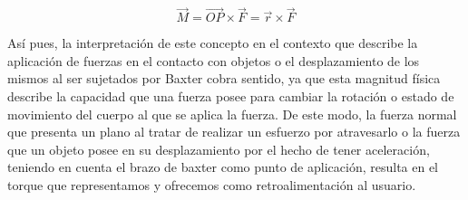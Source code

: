 $$\overrightarrow M = \overrightarrow {OP} \times \overrightarrow F = \overrightarrow r \times \overrightarrow F$$

Así pues, la interpretación de este concepto en el contexto que describe la aplicación de fuerzas en el contacto con objetos o el desplazamiento de los mismos al ser sujetados por Baxter cobra sentido, ya que esta magnitud física describe la capacidad que una fuerza posee para cambiar la rotación o estado de movimiento del cuerpo al que se aplica la fuerza. De este modo, la fuerza normal que presenta un plano al tratar de realizar un esfuerzo por atravesarlo o la fuerza que un objeto posee en su desplazamiento por el hecho de tener aceleración, teniendo en cuenta el brazo de baxter como punto de aplicación, resulta en el torque que representamos y ofrecemos como retroalimentación al usuario.
